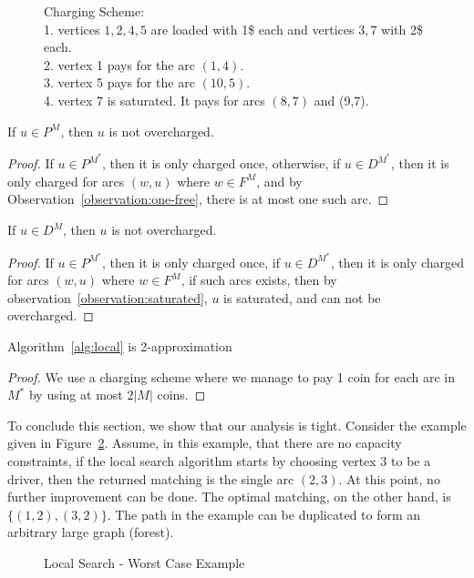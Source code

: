 \begin{figure}
\centering

\caption[]{
\label{fig:charging}
Charging Scheme:																	\\
1. vertices $1,2,4,5$ are loaded with 1\$ each and vertices $3,7$ with 2\$ each.	\\
2. vertex 1 pays for the arc $(1,4)$.												\\
3. vertex 5 pays for the arc $(10,5)$.												\\
4. vertex 7 is saturated. It pays for arcs $(8,7)$ and (9,7). 
}
\end{figure}

\begin{observation}
\label{observation:p-not-charged}
If $u \in P^M$, then $u$ is not overcharged.
\end{observation}

\begin{proof}
If $u \in P^{M^*}$, then it is only charged once, otherwise, 
if $u \in D^{M^*}$, then it is only charged for arcs $(w, u)$ where $w \in F^M$,
and by Observation~\ref{observation:one-free}, there is at most one such arc. 
\end{proof}

\begin{observation}
\label{observation:d-not-charged}
If $u \in D^M$, then $u$ is not overcharged.
\end{observation}

\begin{proof}
If $u \in P^{M^*}$, then it is only charged once, 
if $u \in D^{M^*}$, then it is only charged for arcs $(w, u)$ where $w \in F^M$,
if such arcs exists, then by observation~\ref{observation:saturated}, $u$ is saturated, 
and can not be overcharged.
\end{proof}

\begin{theorem}
Algorithm~\ref{alg:local} is 2-approximation
\end{theorem}

\begin{proof}
We use a charging scheme where we manage to pay 1 coin for each arc in $M^*$
by using at most $2|M|$ coins.
\end{proof}


To conclude this section, we show that our analysis is tight.
Consider the example given in Figure~\ref{fig:localtight}.
Assume, in this example, that there are no capacity constraints,
if the local search algorithm starts by choosing vertex $3$ to be a driver, 
then the returned matching is the single arc $(2,3)$.
At this point, no further improvement can be done.
The optimal matching, on the other hand, is $\{(1, 2), (3, 2)\}$. 
The path in the example can be duplicated to form an arbitrary large graph (forest).

\begin{figure} 

\caption{
\label{fig:localtight}
Local Search - Worst Case Example
}
\end{figure}